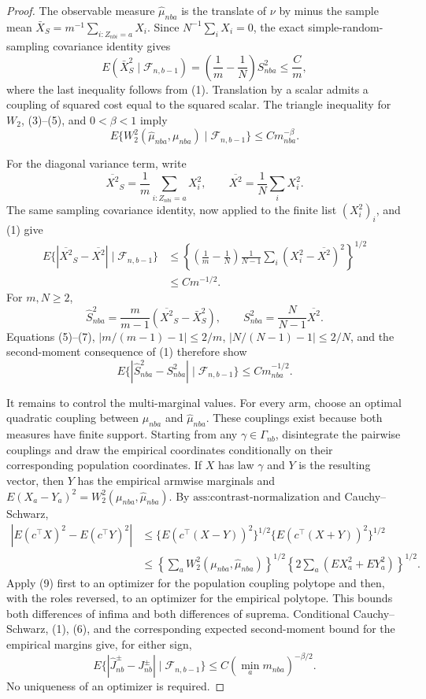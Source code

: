 \documentclass{article}
\begin{document}
\begin{proof}
The observable measure \(\widehat\mu_{nba}\) is the translate of \(\nu\) by minus the sample mean \(\bar X_S=m^{-1}\sum_{i:Z_{nbi}=a}X_i\). Since \(N^{-1}\sum_iX_i=0\), the exact simple-random-sampling covariance identity gives
\[
E(\bar X_S^2\mid\mathcal F_{n,b-1})
=\left(\frac1m-\frac1N\right)S_{nba}^2\le\frac{C}{m},
\tag{5}
\]
where the last inequality follows from (1). Translation by a scalar admits a coupling of squared cost equal to the squared scalar. The triangle inequality for \(W_2\), (3)--(5), and \(0<\beta<1\) imply
\[
E\{W_2^2(\widehat\mu_{nba},\mu_{nba})\mid\mathcal F_{n,b-1}\}
\le C m_{nba}^{-\beta}.
\tag{6}
\]

For the diagonal variance term, write
\[
\overline{X^2}_S=\frac1m\sum_{i:Z_{nbi}=a}X_i^2,
\qquad
\overline{X^2}=\frac1N\sum_iX_i^2.
\]
The same sampling covariance identity, now applied to the finite list \((X_i^2)_i\), and (1) give
\[
\begin{aligned}
E\{|\overline{X^2}_S-\overline{X^2}|\mid\mathcal F_{n,b-1}\}
&\le\left\{\left(\frac1m-\frac1N\right)
\frac1{N-1}\sum_i(X_i^2-\overline{X^2})^2\right\}^{1/2}\\
&\le C m^{-1/2}.
\end{aligned}
\tag{7}
\]
For \(m,N\ge2\),
\[
\widehat S_{nba}^2=\frac{m}{m-1}(\overline{X^2}_S-\bar X_S^2),
\qquad
S_{nba}^2=\frac{N}{N-1}\overline{X^2}.
\]
Equations (5)--(7), \(|m/(m-1)-1|\le2/m\), \(|N/(N-1)-1|\le2/N\), and the second-moment consequence of (1) therefore show
\[
E\{|\widehat S_{nba}^2-S_{nba}^2|\mid\mathcal F_{n,b-1}\}
\le C m_{nba}^{-1/2}.
\tag{8}
\]

It remains to control the multi-marginal values. For every arm, choose an optimal quadratic coupling between \(\mu_{nba}\) and \(\widehat\mu_{nba}\). These couplings exist because both measures have finite support. Starting from any \(\gamma\in\Gamma_{nb}\), disintegrate the pairwise couplings and draw the empirical coordinates conditionally on their corresponding population coordinates. If \(X\) has law \(\gamma\) and \(Y\) is the resulting vector, then \(Y\) has the empirical armwise marginals and
\(E(X_a-Y_a)^2=W_2^2(\mu_{nba},\widehat\mu_{nba})\). By \(\text{ass:contrast-normalization}\) and Cauchy--Schwarz,
\[
\begin{aligned}
|E(c^\top X)^2-E(c^\top Y)^2|
&\le\{E(c^\top(X-Y))^2\}^{1/2}
\{E(c^\top(X+Y))^2\}^{1/2}\\
&\le\left\{\sum_aW_2^2(\mu_{nba},\widehat\mu_{nba})\right\}^{1/2}
\left\{2\sum_a(EX_a^2+EY_a^2)\right\}^{1/2}.
\end{aligned}
\tag{9}
\]
Apply (9) first to an optimizer for the population coupling polytope and then, with the roles reversed, to an optimizer for the empirical polytope. This bounds both differences of infima and both differences of suprema. Conditional Cauchy--Schwarz, (1), (6), and the corresponding expected second-moment bound for the empirical margins give, for either sign,
\[
E\{|\widehat J_{nb}^{\pm}-J_{nb}^{\pm}|\mid\mathcal F_{n,b-1}\}
\le C\left(\min_a m_{nba}\right)^{-\beta/2}.
\tag{10}
\]
No uniqueness of an optimizer is required.


\end{proof}
\end{document}
